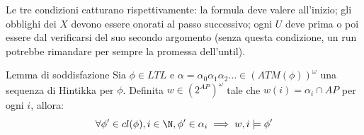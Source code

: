 Le tre condizioni catturano rispettivamente: la formula deve valere all'inizio; gli obblighi dei \(X\) devono essere onorati al passo successivo; ogni \(U\) deve prima o poi essere  dal verificarsi del suo secondo argomento (senza questa condizione, un run potrebbe rimandare per sempre la promessa dell'until).

 \begin{lemma}{Lemma di soddisfazione}
  Sia \(\phi \in LTL\) e \(\alpha = \alpha_0\alpha_1\alpha_2\ldots \in {(ATM(\phi))}^\omega\) una sequenza di Hintikka per \(\phi\). Definita \(w \in {(2^{AP})}^\omega\) tale che \(w(i) = \alpha_i \cap AP\) per ogni \(i\), allora:
    \[
      \forall \phi' \in cl(\phi), i \in \N, \phi' \in \alpha_i \implies w,i \models \phi'
    \]
  \end{lemma}

